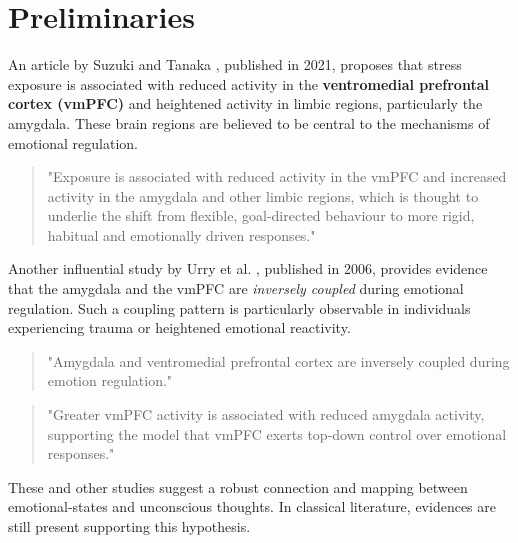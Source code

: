 \section{Preliminaries}

An article by Suzuki and Tanaka \cite{suzuki2021}, published in 2021, proposes that stress exposure is associated with reduced activity in the \textbf{ventromedial prefrontal cortex (vmPFC)} and heightened activity in limbic regions, particularly the amygdala. These brain regions are believed to be central to the mechanisms of emotional regulation.

\begin{quote}
"Exposure is associated with reduced activity in the vmPFC and increased activity in the amygdala and other limbic regions, which is thought to underlie the shift from flexible, goal-directed behaviour to more rigid, habitual and emotionally driven responses."
\end{quote}

Another influential study by Urry et al. \cite{Urry2006}, published in 2006, provides evidence that the amygdala and the vmPFC are \emph{inversely coupled} during emotional regulation. Such a coupling pattern is particularly observable in individuals experiencing trauma or heightened emotional reactivity.

\begin{quote}
"Amygdala and ventromedial prefrontal cortex are inversely coupled during emotion regulation."
\end{quote}
\begin{quote}
"Greater vmPFC activity is associated with reduced amygdala activity, supporting the model that vmPFC exerts top-down control over emotional responses."
\end{quote}

These and other studies suggest a robust connection and mapping between emotional-states and unconscious thoughts. In classical literature, evidences are still present supporting this hypothesis.
